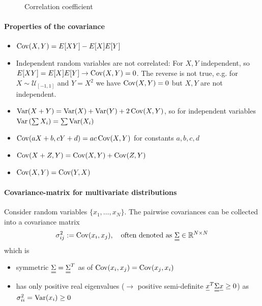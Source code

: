 
\begin{figure}[!htb]
    \centering
    
    \caption{Correlation coefficient}
    \label{fig:corr_coef}
\end{figure}

\paragraph*{Properties of the covariance}
\begin{itemize}
    \item $\operatorname{Cov}(X,Y) = E[XY] - E[X]E[Y]$
    \item \textcolor{blue1}{Independent random variables are not correlated:} For $X,Y$ independent, so
    $E[XY] = E[X]E[Y] \rightarrow \operatorname{Cov}(X,Y) = 0$. \textcolor{red1}{The reverse is not true}, e.g. for
    $X \sim \mathcal{U}_{[-1,1]}$ and $Y = X^2$ we have $\operatorname{Cov}(X,Y) = 0$ but $X,Y$ are not independent.
    \item $\operatorname{Var}(X+Y) = \operatorname{Var}(X) + \operatorname{Var}(Y) + 2\operatorname{Cov}(X,Y)$, so for independent variables $\operatorname{Var}\left( \sum X_i \right) = \sum \operatorname{Var}(X_i)$
    \item $\operatorname{Cov}(aX+b, cY+d) = ac\operatorname{Cov}(X,Y)$ for constants $a,b,c,d$
    \item $\operatorname{Cov}(X+Z,Y) = \operatorname{Cov}(X,Y) + \operatorname{Cov}(Z,Y)$
    \item $\operatorname{Cov}(X,Y) = \operatorname{Cov}(Y,X)$
\end{itemize}

\paragraph*{Covariance-matrix for multivariate distributions}
Consider random variables $\{x_1,\dots,x_N\}$. The pairwise covariances
can be collected into a covariance matrix
\begin{equation}
    \sigma_{ij}^2 := \Cov(x_i,x_j), \quad \text{often denoted as } \mat{\Sigma} \in \mathbb{R}^{N \times N}
\end{equation}
which is
\begin{itemize}
    \item symmetric $\mat{\Sigma} = \mat{\Sigma}^T$ as of $\operatorname{Cov}(x_i,x_j) = \operatorname{Cov}(x_j,x_i)$
    \item has only positive real eigenvalues ($\rightarrow$ positive semi-definite $\vec{x}^T \mat{\Sigma} \vec{x} \geq 0$) as $\sigma_{ii}^2 = \operatorname{Var}(x_i) \geq 0$
\end{itemize}

